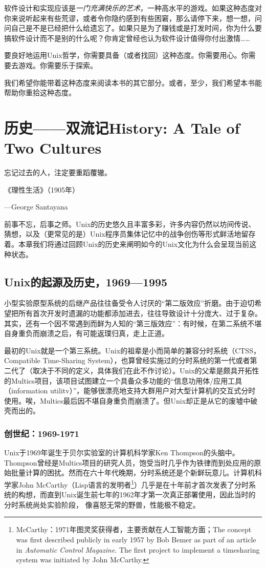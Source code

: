 \documentclass[12pt,oneside]{book}
\begin{document}
软件设计和实现应该是\emph{一门充满快乐的艺术}，一种高水平的游戏。如果这种态度对你来说听起来有些荒谬，或者令你隐约感到有些困窘，那么请停下来，想一想，问问自己是不是已经把什么给遗忘了。如果只是为了赚钱或是打发时间，你为什么要搞软件设计而不是别的什么呢？你肯定曾经也认为软件设计值得你付出激情……

要良好地运用Unix哲学，你需要具备（或者找回）这种态度。你需要用心。你需要去游戏。你需要乐于探索。

我们希望你能带着这种态度来阅读本书的其它部分。或者，至少，我们希望本书能帮助你重拾这种态度。


\chapter[历史——双流记]{历史——双流记History: A Tale of Two Cultures}
\begin{flushright}
忘记过去的人，注定要重蹈覆辙。

{\hfill 《理性生活》（1905年）}

{\hfill —George Santayana}
\end{flushright}

前事不忘，后事之师。Unix的历史悠久且丰富多彩，许多内容仍然以坊间传说、猜想，以及（更常见的是）Unix程序员集体记忆中的战争创伤等形式鲜活地留存着。本章我们将通过回顾Unix的历史来阐明如今的Unix文化为什么会呈现当前这种状态。

\section{Unix的起源及历史，1969—1995}
小型实验原型系统的后继产品往往备受令人讨厌的“第二版效应”折磨。由于迫切希望把所有首次开发时遗漏的功能都添加进去，往往导致设计十分庞大、过于复杂。其实，还有一个因不常遇到而鲜为人知的“第三版效应”：有时候，在第二系统不堪自身重负而崩溃之后，有可能返璞归真，走上正道。

最初的Unix就是一个第三系统。Unix的祖辈是小而简单的兼容分时系统（CTSS，Compatible Time-Sharing System），也算曾经实施过的分时系统的第一代或者第二代了（取决于不同的定义，具体我们在此不作讨论）。Unix的父辈是颇具开拓性的Multics项目，该项目试图建立一个具备众多功能的“信息功用体/应用工具（information utilitv）”，能够很漂亮地支持大群用户对大型计算机的交互式分时使用。唉，Multics最后因不堪自身重负而崩溃了。但Unix却正是从它的废墟中破壳而出的。

\subsection{创世纪：1969-1971}
Unix于1969年诞生于贝尔实验室的计算机科学家Ken Thompson的头脑中。Thompson曾经是Multics项目的研究人员，饱受当时几乎作为铁律而到处应用的原始批量计算的困扰。然而在六十年代晚期，分时系统还是个新鲜玩意儿。计算机科学家John McCarthy（Lisp语言的发明者\footnote{McCarthy：1971年图灵奖获得者，主要贡献在人工智能方面；The concept was first described publicly in early 1957 by Bob Bemer as part of an article in \textit{Automatic Control Magazine}.  The first project to implement a timesharing system was initiated by John McCarthy. }）几乎是在十年前才首次发表了分时系统的构想，而直到Unix诞生前七年的1962年才第一次真正部署使用，因此当时的分时系统尚处实验阶段，
像喜怒无常的野兽，性能极不稳定。
\end{document}
